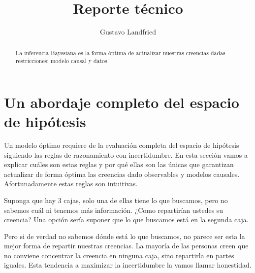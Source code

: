 \documentclass[a4paper,10pt]{article}
\title{Reporte técnico}
\author{Gustavo Landfried}
\begin{document}
\maketitle

\begin{abstract}
 La inferencia Bayesiana es la forma \'optima de actualizar nuestras creencias dadas restricciones: modelo causal y datos.
\end{abstract}


\section{Un abordaje completo del espacio de hip\'otesis}

Un modelo \'optimo requiere de la evaluaci\'on completa del espacio de hip\'otesis siguiendo las reglas de razonamiento con incertidumbre.
 En esta secci\'on vamos a explicar cu\'ales son estas reglas y por qu\'e ellas son las \'unicas que garantizan actualizar de forma \'optima las creencias dado observables y modelos causales.
Afortunadamente estas reglas son intuitivas.
 
 Suponga que hay 3 cajas, solo una de ellas tiene lo que buscamos, pero no sabemos cu\'al ni tenemos m\'as informaci\'on.
 ¿Como repartirían ustedes su creencia?
 Una opción sería suponer que lo que buscamos está en la segunda caja.
 
\begin{figure}[H]     
    \centering \small
    \begin{subfigure}[b]{0.49\textwidth}
    \centering
    \end{subfigure}
\end{figure}

Pero si de verdad no sabemos d\'onde est\'a lo que buscamos, no parece ser esta la mejor forma de repartir nuestras creencias.
La mayor\'ia de las personas creen que no conviene concentrar la creencia en ninguna caja, sino repartirla en partes iguales.
Esta tendencia a maximizar la incertidumbre la vamos llamar honestidad.

\begin{figure}[H]     
    \centering \small
    \begin{subfigure}[b]{0.49\textwidth}
    \centering
    \end{subfigure}
\end{figure}
\end{document}

